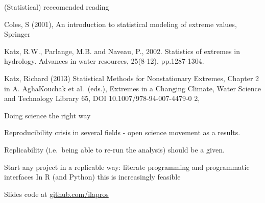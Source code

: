 \documentclass[
  10pt,
  ignorenonframetext,
  compress]{beamer}
\begin{document}
\begin{frame}{(Statistical) reccomended reading}
\protect\hypertarget{statistical-reccomended-reading}{}

Coles, S (2001), An introduction to statistical modeling of extreme
values, Springer

Katz, R.W., Parlange, M.B. and Naveau, P., 2002. Statistics of extremes
in hydrology. Advances in water resources, 25(8-12), pp.1287-1304.

Katz, Richard (2013) Statistical Methods for Nonstationary Extremes,
Chapter 2 in A. AghaKouchak et al.~(eds.), Extremes in a Changing
Climate, Water Science and Technology Library 65, DOI
10.1007/978-94-007-4479-0 2,

\end{frame}

\begin{frame}{Doing science the right way}
\protect\hypertarget{doing-science-the-right-way}{}

Reproducibility crisis in several fields - open science movement as a
results.

Replicability (i.e.~being able to re-run the analysis) should be a
given.

Start any project in a replicable way: literate programming and
programmatic interfaces In R (and Python) this is increasingly feasible

Slides code at
\href{www.github.com/ilapros/PerugiaSummerSchool/July2020}{github.com/ilapros}

\end{frame}
\end{document}
